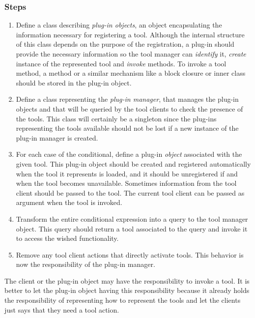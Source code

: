 \documentclass[a4paper,10pt,twoside]{book}
\begin{document}
\subsubsection*{Steps}
\begin{enumerate}
  \item Define a class describing \emph{plug-in objects}, \ie an object encapsulating the information necessary for registering a tool. Although the internal structure of this class depends on the purpose of the registration, a plug-in should provide the necessary information so the tool manager can \emph{identify} it, \emph{create} instance of the represented tool and \emph{invoke} methods. To invoke a tool method, a method or a similar mechanism like a block closure or inner class should be stored in the plug-in object. 

  \item Define a class representing the \emph{plug-in manager}, \ie that manages the plug-in objects and that will be queried by the tool clients to check the presence of the tools. This class will certainly be a singleton since the plug-ins representing the tools available should not be lost if a new instance of the plug-in manager is created.

  \item For each case of the conditional, define a plug-in \emph{object} associated with the given tool. This plug-in object should be created and registered automatically when the tool it represents is loaded, and it should be unregistered if and when the tool becomes unavailable. Sometimes information from the tool client should be passed to the tool. The current tool client can be passed as argument when the tool is invoked. 

  \item Transform the entire conditional expression into a query to the tool manager object. This query should return a tool associated to the query and invoke it to access the wished functionality.

  \item Remove any tool client actions that directly activate tools. This behavior is now the responsibility of the plug-in manager.
\end{enumerate}

The client or the plug-in object may have the responsibility to invoke a tool. It is better to let the plug-in object having this responsibility because it already holds the responsibility of representing how to represent the tools and let the clients just says that they need a tool action.
\end{document}
